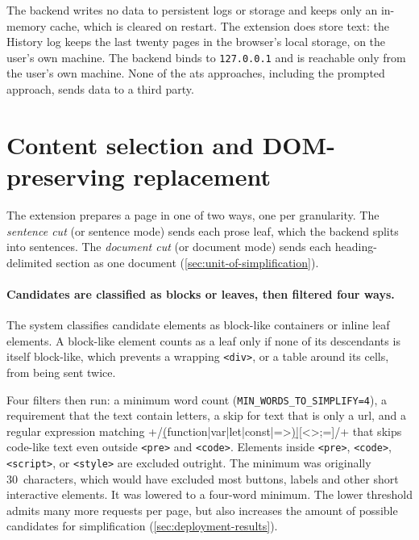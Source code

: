 The backend writes no data to persistent logs or storage and keeps only an in-memory cache, which is cleared on restart.
The extension does store text: the History log keeps the last twenty pages in the browser's local storage, on the user's own machine.
The backend binds to \texttt{127.0.0.1} \parencite{fastAPI2026docs} and is reachable only from the user's own machine.
None of the \gls{ats} approaches, including the prompted approach, sends data to a third party.

\pagebreak

\section{Content selection and DOM-preserving replacement}
\label{sec:content-selection}

The extension prepares a page in one of two ways, one per granularity.
The \emph{sentence cut} (or sentence mode) sends each prose leaf, which the backend splits into sentences.
The \emph{document cut} (or document mode) sends each heading-delimited section as one document (\cref{sec:unit-of-simplification}).

\paragraph{Candidates are classified as blocks or leaves, then filtered four ways.}
The system classifies candidate elements as block-like containers or inline leaf elements.
A block-like element counts as a leaf only if none of its descendants is itself block-like, which prevents a wrapping \texttt{<div>}, or a table around its cells, from being sent twice.

Four filters then run: a minimum word count (\texttt{MIN\_WORDS\_TO\_SIMPLIFY=4}), a requirement that the text contain letters, a skip for text that is only a \gls{url}, and a regular expression matching \codeverb+/\b(function|var|let|const|=>)\b|[{}<>;=]/+ that skips code-like text even outside \texttt{<pre>} and \texttt{<code>}.
Elements inside \texttt{<pre>}, \texttt{<code>}, \texttt{<script>}, or \texttt{<style>} are excluded outright.
The minimum was originally 30~characters, which would have excluded most buttons, labels and other short interactive elements.
It was lowered to a four-word minimum.
The lower threshold admits many more requests per page, but also increases the amount of possible candidates for simplification (\cref{sec:deployment-results}).

